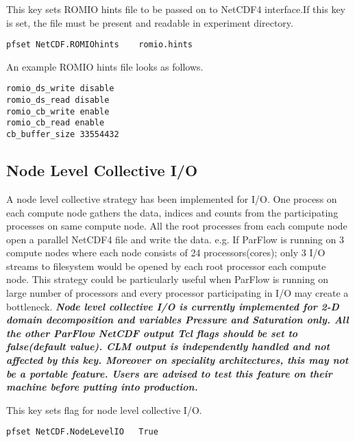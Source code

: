 {This key sets ROMIO hints file to be passed on to NetCDF4 interface.If this key is set, the file must be present and readable in experiment directory.}
\begin{display}\begin{verbatim}
pfset NetCDF.ROMIOhints    romio.hints
\end{verbatim}\end{display}
An example ROMIO hints file looks as follows.
\begin{display}\begin{verbatim}
romio_ds_write disable
romio_ds_read disable
romio_cb_write enable
romio_cb_read enable
cb_buffer_size 33554432
\end{verbatim}\end{display}

\subsection{Node Level Collective I/O}
A node level collective strategy has been implemented for I/O. One process on each compute node gathers the data, indices and counts from the participating processes on same compute node. All the root processes from each compute node open a parallel NetCDF4 file and write the data. e.g. If ParFlow is running on 3 compute nodes where each node consists of 24 processors(cores); only 3 I/O streams to filesystem would be opened by each root processor each compute node. This strategy could be particularly useful when ParFlow is running on large number of processors and every processor participating in I/O may create a bottleneck.
\textit{\textbf{Node level collective I/O is currently implemented for 2-D domain decomposition and variables Pressure and Saturation only. All the other ParFlow NetCDF output Tcl flags should be set to false(default value). CLM output is independently handled and not affected by this key.  Moreover on speciality architectures, this may not be a portable feature. Users are advised to test this feature on their machine before putting into production.}}

{This key sets flag for node level collective I/O.}
\begin{display}\begin{verbatim}
pfset NetCDF.NodeLevelIO   True
\end{verbatim}\end{display}


